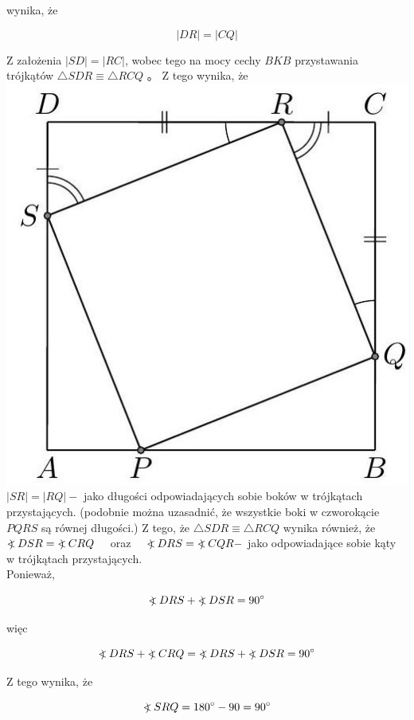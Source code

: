 \documentclass[10pt]{article}
\newcommand\Varangle{\mathop{{<\!\!\!\!\!\text{\small)}}\:}\nolimits}
\begin{document}
wynika, że

\[
|D R|=|C Q|
\]

Z założenia \(|S D|=|R C|\), wobec tego na mocy cechy \(B K B\) przystawania trójkątów \(\triangle S D R \equiv \triangle R C Q\) 。 Z tego wynika, że\\
\includegraphics[max width=\textwidth, center]{2024_11_21_71f62bd117d375398909g-061(1)}\\
\(|S R|=|R Q|-\) jako długości odpowiadających sobie boków w trójkątach przystających. (podobnie można uzasadnić, że wszystkie boki w czworokącie \(P Q R S\) są równej długości.) Z tego, że \(\triangle S D R \equiv \triangle R C Q\) wynika również, że\\
\(\Varangle D S R=\Varangle C R Q \quad\) oraz \(\quad \Varangle D R S=\Varangle C Q R-\) jako odpowiadające sobie kąty w trójkątach przystających.\\
Ponieważ,

\[
\Varangle D R S+\Varangle D S R=90^{\circ}
\]

więc

\[
\Varangle D R S+\Varangle C R Q=\Varangle D R S+\Varangle D S R=90^{\circ}
\]

Z tego wynika, że

\[
\Varangle S R Q=180^{\circ}-90=90^{\circ}
\]
\end{document}
